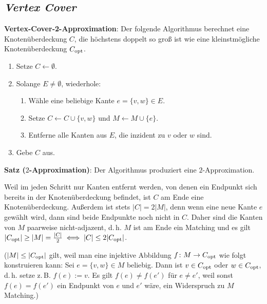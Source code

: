 \pagebreak

\subsection{%
    \emph{Vertex Cover}%
}

\textbf{Vertex-Cover-2-Approximation}:
Der folgende Algorithmus berechnet eine Knotenüberdeckung $C$, die höchstens doppelt so
groß ist wie eine kleinstmögliche Knotenüberdeckung $C_{\text{opt}}$.
\begin{enumerate}
    \item
    Setze $C \leftarrow \emptyset$.
    
    \item
    Solange $E \not= \emptyset$, wiederhole:
    \begin{enumerate}
        \item
        Wähle eine beliebige Kante $e = \{v, w\} \in E$.
        
        \item
        Setze $C \leftarrow C \cup \{v, w\}$ und $M \leftarrow M \cup \{e\}$.
        
        \item
        Entferne alle Kanten aus $E$, die inzident zu $v$ oder $w$ sind.
    \end{enumerate}
    
    \item
    Gebe $C$ aus.
\end{enumerate}

\linie

\textbf{Satz ($2$-Approximation)}:
Der Algorithmus produziert eine $2$-Approximation.

\begin{Beweis}
    Weil im jeden Schritt nur Kanten entfernt werden, von denen ein Endpunkt sich bereits in der
    Knotenüberdeckung befindet, ist $C$ am Ende eine Knotenüberdeckung.
    Außerdem ist stets $|C| = 2|M|$, denn wenn eine neue Kante $e$ gewählt wird, dann sind beide
    Endpunkte noch nicht in $C$.
    Daher sind die Kanten von $M$ paarweise nicht-adjazent,
    d.\,h. $M$ ist am Ende ein Matching und es gilt
    $|C_{\text{opt}}| \ge |M| = \frac{|C|}{2} \iff |C| \le 2|C_{\text{opt}}|$.
    
    ($|M| \le |C_{\text{opt}}|$ gilt, weil man eine injektive Abbildung
    $f\colon M \to C_{\text{opt}}$ wie folgt konstruieren kann:
    Sei $e = \{v, w\} \in M$ beliebig.
    Dann ist $v \in C_{\text{opt}}$ oder $w \in C_{\text{opt}}$, d.\,h. setze z.\,B. $f(e) := v$.
    Es gilt $f(e) \not= f(e')$ für $e \not= e'$,
    weil sonst $f(e) = f(e')$ ein Endpunkt von $e$ und $e'$ wäre,
    ein Widerspruch zu $M$ Matching.)
\end{Beweis}

